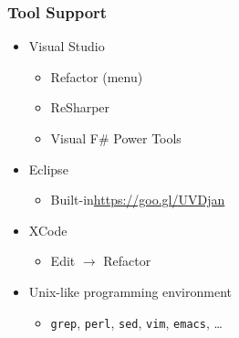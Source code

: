 \begin{frame}

\frametitle{Tool Support}

\begin{itemize}

\item Visual Studio

\begin{itemize}

\item Refactor (menu)

\item ReSharper

\item Visual F\# Power Tools

\end{itemize}

\item Eclipse

\begin{itemize}

\item Built-in\hfill \url{https://goo.gl/UVDjan}


\end{itemize}

\item XCode

\begin{itemize}

\item Edit $\rightarrow$ Refactor

\end{itemize}

\item Unix-like programming environment

\begin{itemize}

\item \texttt{grep}, \texttt{perl}, \texttt{sed}, \texttt{vim}, \texttt{emacs}, \ldots

\end{itemize}

\end{itemize}

\end{frame}
